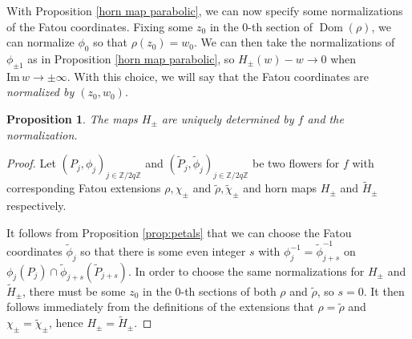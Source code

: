 \documentclass[12pt,letterpaper]{amsart}
\numberwithin{equation}{section}
\newtheorem{prop}[equation]{Proposition}
\theoremstyle{remark}
\theoremstyle{definition}
\newcommand{\C}{\mathbb C}
\newcommand{\Z}{\mathbb Z}
\DeclareMathOperator{\Dom}{Dom}
\begin{document}
	
	
	With Proposition \ref{horn map parabolic}, we can now specify some normalizations of the Fatou coordinates.
	Fixing some $z_0$ in the $0$-th section of $\Dom(\rho)$, we can normalize $\phi_0$ so that $\rho(z_0) = w_0$. 
	We can then take the normalizations of $\phi_{\pm 1}$ as in Proposition \ref{horn map parabolic}, so $H_\pm(w)-w\to 0$ when $\text{Im}\,w\to \pm \infty$.
	With this choice, we will say that the Fatou coordinates are \textit{normalized by $(z_0, w_0)$}. 
	\begin{prop}\label{prop:unqiue extensions}
		The maps $H_\pm$ are uniquely determined by $f$ and the normalization.
	\end{prop}
	
	\begin{proof}
		Let $(P_j, \phi_j)_{j\in \Z/2q\Z}$ and $(\tilde{P}_j, \tilde \phi_j)_{j\in \Z/2q\Z}$ be two flowers for $f$ with corresponding 
		Fatou extensions $\rho, \chi_\pm$ and $\tilde \rho, \tilde \chi_\pm$ and 
		horn maps $H_\pm$ and $\tilde{H}_\pm$ respectively.
		
		It follows from Proposition \ref{prop:petals} that we can choose the Fatou coordinates $\tilde \phi_j$ so that 
		there is some even integer $s$ with $\phi_j^{-1}=\tilde \phi_{j+s}^{-1}$ on $\phi_j(P_j)\cap \tilde\phi_{j+s} (\tilde P_{j+s}).$
		In order to choose the same normalizations for $H_\pm$ and $\tilde{H}_\pm$, there must be some $z_0$ in the $0$-th sections of both $\rho$ and $\tilde \rho$, so $s = 0$.
		It then follows immediately from the definitions of the extensions that $\rho = \tilde \rho$ and $\chi_\pm = \tilde\chi_\pm$, hence $H_\pm= \tilde H_\pm$. 
	\end{proof}
	
	
%	
%	
%	
	
\end{document}
